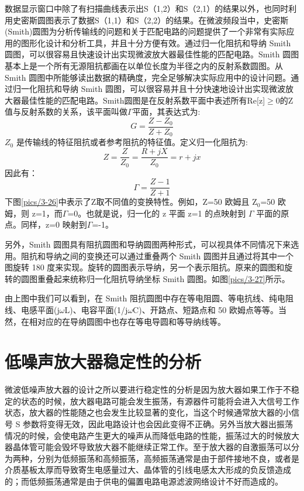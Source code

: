 数据显示窗口中除了有扫描曲线表示出S（1,2）和S（2,1）的结果以外，也同时利用史密斯圆图表示了数据S（1,1）和S（2,2）的结果。在微波频段当中，史密斯(Smith)圆图为分析传输线的问题和关于匹配电路的问题提供了一个非常有实际应用的图形化设计和分析工具，并且十分方便有效。通过归一化阻抗和导纳 Smith 圆图，可以很容易且快速设计出实现微波放大器最佳性能的匹配电路。Smith 圆图基本上是一个所有无源阻抗都画在以单位长度为半径之内的反射系数圆图。从 Smith 圆图中所能够读出数据的精确度，完全足够解决实际应用中的设计问题。通过归一化阻抗和导纳 Smith 圆图，可以很容易并且十分快速地设计出实现微波放大器最佳性能的匹配电路。Smith圆图是在反射系数平面中表述所有Re[z]$\geqslant$0的Z值与反射系数的关系，该平面叫做$\Gamma$平面，其表达式为:
\begin{equation}%
G=\frac{Z-Z_0}{Z+Z_0}
\end{equation}
$Z_0$ 是传输线的特征阻抗或者参考阻抗的特征值。定义归一化阻抗为:
\begin{equation}%
Z=\frac{Z}{Z_0}=\frac{R+jX}{Z_0}=r+jx
\end{equation}
因此有：
\begin{equation}%
\Gamma=\frac{Z-1}{Z+1}
\end{equation}
下图\ref{pics/3-26}中表示了Z取不同值的变换特性。例如，Z=50 欧姆且 Z$_0$=50 欧姆，则 z=1，而$\Gamma$=0。也就是说，归一化的 z 平面 z=1 的点映射到 $\Gamma$ 平面的原点。同样，z=0 映射到$\Gamma$=-1。



另外，Smith 圆图具有阻抗圆图和导纳圆图两种形式，可以视具体不同情况下来选用。阻抗和导纳之间的变换还可以通过重叠两个 Smith 圆图并且通过将其中一个图旋转 180 度来实现。旋转的圆图表示导纳，另一个表示阻抗。原来的圆图和旋转的圆图重叠起来统称归一化阻抗导纳坐标 Smith 圆图。如图\ref{pics/3-27}所示。

由上图中我们可以看到，在 Smith 阻抗圆图中存在等电阻圆、等电抗线、纯电阻线、电感平面(j$\omega$L)、电容平面(1/j$\omega$C)、开路点、短路点和 50 欧姆点等等。当然，在相对应的在导纳圆图中也存在等电导圆和等导纳线等。

\section{低噪声放大器稳定性的分析}
微波低噪声放大器的设计之所以要进行稳定性的分析是因为放大器如果工作于不稳定的状态的时候，放大器电路可能会发生振荡，有源器件可能将会进入大信号工作状态，放大器的性能随之也会发生比较显著的变化，当这个时候通常放大器的小信号 S 参数将变得无效，因此电路设计也会因此变得不正确。另外当放大器出振荡情况的时候，会使电路产生更大的噪声从而降低电路的性能，振荡过大的时候放大器晶体管可能会毁坏导致放大器不能继续正常工作。至于放大器的自激振荡可以分为两种，分别为低频振荡和高频振荡，高频振荡通常是由于部件接地不良，或者是介质基板太厚而导致寄生电感量过大、晶体管的引线电感太大形成的负反馈造成的；而低频振荡通常是由于供电的偏置电路电源滤波网络设计不好而造成的。

